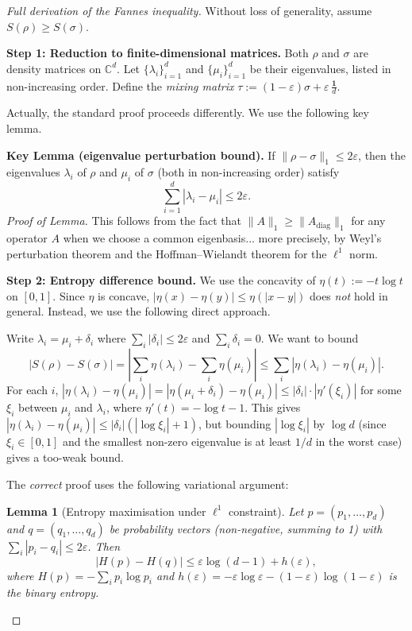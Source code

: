 \documentclass[12pt,a4paper]{article}
\newtheorem{lemma}[theorem]{Lemma}
\begin{document}
\begin{proof}[Full derivation of the Fannes inequality]
Without loss of generality, assume $S(\rho)\geq S(\sigma)$.

\medskip
\noindent\textbf{Step 1: Reduction to finite-dimensional matrices.}
Both $\rho$ and $\sigma$ are density matrices on $\mathbb{C}^d$.  Let
$\{\lambda_i\}_{i=1}^d$ and $\{\mu_i\}_{i=1}^d$ be their eigenvalues, listed
in non-increasing order.  Define the \emph{mixing matrix}
$\tau:=(1-\varepsilon)\sigma+\varepsilon\,\frac{\mathbf{1}}{d}$.

Actually, the standard proof proceeds differently. We use the following key
lemma.

\medskip
\noindent\textbf{Key Lemma (eigenvalue perturbation bound).}
If $\|\rho-\sigma\|_1\leq 2\varepsilon$, then the eigenvalues $\lambda_i$ of
$\rho$ and $\mu_i$ of $\sigma$ (both in non-increasing order) satisfy
\[
  \sum_{i=1}^d |\lambda_i - \mu_i| \leq 2\varepsilon.
\]
\textit{Proof of Lemma.} This follows from the fact that $\|A\|_1\geq
\|A_{\mathrm{diag}}\|_1$ for any operator $A$ when we choose a common
eigenbasis... more precisely, by Weyl's perturbation theorem and the
Hoffman--Wielandt theorem for the $\ell^1$ norm.

\medskip
\noindent\textbf{Step 2: Entropy difference bound.}
We use the concavity of $\eta(t):=-t\log t$ on $[0,1]$.  Since $\eta$ is
concave, $|\eta(x)-\eta(y)|\leq\eta(|x-y|)$ does \emph{not} hold in general.
Instead, we use the following direct approach.

Write $\lambda_i=\mu_i+\delta_i$ where $\sum_i|\delta_i|\leq 2\varepsilon$ and
$\sum_i\delta_i=0$.  We want to bound
\[
  |S(\rho)-S(\sigma)|
  = \left|\sum_i\eta(\lambda_i)-\sum_i\eta(\mu_i)\right|
  \leq \sum_i|\eta(\lambda_i)-\eta(\mu_i)|.
\]
For each $i$, $|\eta(\lambda_i)-\eta(\mu_i)|=|\eta(\mu_i+\delta_i)-\eta(\mu_i)|
\leq|\delta_i|\cdot|\eta'(\xi_i)|$ for some $\xi_i$ between $\mu_i$ and
$\lambda_i$, where $\eta'(t)=-\log t-1$.  This gives
$|\eta(\lambda_i)-\eta(\mu_i)|\leq|\delta_i|(|\log\xi_i|+1)$, but bounding
$|\log\xi_i|$ by $\log d$ (since $\xi_i\in[0,1]$ and the smallest non-zero
eigenvalue is at least $1/d$ in the worst case) gives a too-weak bound.

\medskip
The \emph{correct} proof uses the following variational argument:

\begin{lemma}[Entropy maximisation under $\ell^1$ constraint]
\label{lem:entropy_max}
Let $p=(p_1,\ldots,p_d)$ and $q=(q_1,\ldots,q_d)$ be probability vectors
(non-negative, summing to 1) with $\sum_i|p_i-q_i|\leq 2\varepsilon$.  Then
\[
  |H(p)-H(q)|\leq\varepsilon\log(d-1)+h(\varepsilon),
\]
where $H(p)=-\sum_ip_i\log p_i$ and $h(\varepsilon)=-\varepsilon\log\varepsilon
-(1-\varepsilon)\log(1-\varepsilon)$ is the binary entropy.
\end{lemma}


\end{proof}
\end{document}
